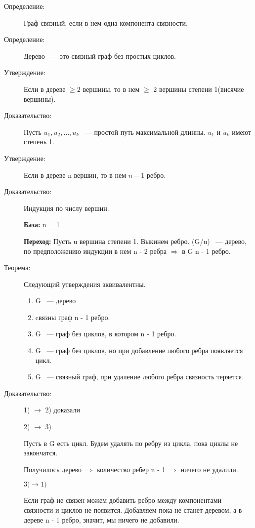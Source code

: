 \documentclass[12pt]{article}
\begin{document}
\begin{description}
\item[Определение:] Граф связный, если в нем одна компонента связности.
\item[Определение:] Дерево ~--- это связный граф без простых циклов.

\item[Утверждение:] Если в дереве $\ge 2$ вершины, то в нем $\ge$ 2 вершины степени 1(висячие вершины).

\item[Доказательство:] Пусть $u_1, u_2, \ldots, u_k$ ~--- простой путь максимальной длинны.  $u_1$ и $u_k$ имеют степень 1.

\item[Утверждение:] Если в дереве n вершин, то в нем $n - 1$ ребро.

\item[Доказательство:] Индукция по числу вершин.

{\bf База:} n = 1

{\bf Переход:} Пусть u вершина степени 1. Выкинем ребро. (G/u) ~--- дерево, по предположению индукции в нем n - 2 ребра $\Rightarrow$ в G n  - 1 ребро. 

\item[Теорема:] Следующий утверждения эквивалентны. 

\begin{enumerate}
\item G ~--- дерево
\item cвязны граф n - 1 ребро.
\item G ~--- граф без циклов, в котором n - 1 ребро. 
\item G ~--- граф без циклов, но при добавление любого ребра появляется цикл. 
\item G ~--- связный граф, при удаление любого ребра связность теряется.
\end{enumerate}

\item[Доказательство:] 1) $\to$ 2) доказали

2) $\to$ 3)

Пусть в G есть цикл. Будем удалять по ребру из цикла, пока циклы не закончатся. 

Получилось дерево $\Rightarrow$ количество ребер n - 1 $\Rightarrow$ ничего не удалили.

$3) \to 1)$

Если граф не связен можем добавить ребро между компонентами связности и циклов не появится. Добавляем пока не станет деревом, а в дереве n - 1 ребро, значит, мы ничего не добавили. 


\end{description}
\end{document}
